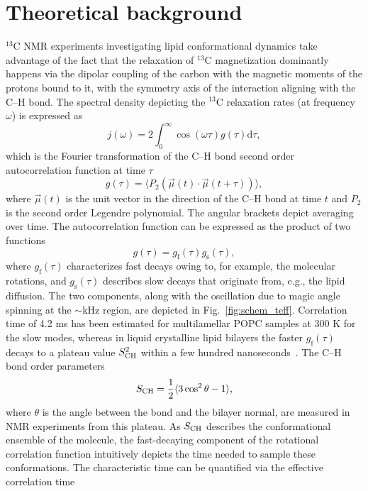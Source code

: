 \documentclass[journal=jpcbfk,manuscript=article,layout=twocolumn]{achemso}
\begin{document}
\section{Theoretical background}\label{sec:theory}
$^{13}$C NMR experiments investigating lipid conformational dynamics take advantage of the fact that the relaxation of $^{13}$C magnetization dominantly happens via the dipolar coupling of the carbon with the magnetic moments of the protons bound to it, with the symmetry axis of the interaction aligning with the C--H bond. The spectral density depicting the $^{13}$C relaxation rates (at frequency $\omega$) is expressed as
\begin{equation}
j{(\omega)}=2\int_{0}^{\infty}\cos(\omega\tau)g(\tau)\mathrm d\tau ,
\end{equation}
which is the Fourier transformation of the C--H bond second order autocorrelation function at time $\tau$
\begin{equation}
\label{eq:BCF}
g(\tau)=\langle P_{2}\left(\vec{\mu}(t)\cdot \vec{\mu}(t+\tau)\right)\rangle ,
\end{equation}
where $\vec{\mu}(t)$ is the unit vector in the direction of the C--H bond at time $t$ and $P_{2}$ is the second order Legendre polynomial. The angular brackets depict averaging over time. The autocorrelation function can be expressed as the product of two functions
\begin{equation}
g(\tau)=g_{\mathrm{f}}(\tau)g_{\mathrm{s}}(\tau) ,
\end{equation} 
where $g_{\mathrm{f}}(\tau)$ characterizes fast decays owing to, for example, the molecular  rotations, and $g_{\mathrm{s}}(\tau)$ describes slow decays that originate from, e.g., the lipid diffusion. The two components, along with the oscillation due to magic angle spinning at the $\sim$kHz region, are depicted in Fig.~\ref{fig:schem_teff}. Correlation time of 4.2 ms has been estimated for multilamellar POPC samples at 300 K for the slow modes, whereas  in liquid crystalline lipid bilayers the faster $g_{\mathrm{f}}(\tau)$ decays to a plateau value $S^{2}_{\rm{CH}}$ within a few hundred nanoseconds~\cite{ferreira15}. The C--H bond order parameters
\begin{equation}
\label{eq:OP}
S_{\rm{CH}}=\frac{1}{2}\langle 3\cos^{2}\theta-1\rangle ,
\end{equation}
where $\theta$ is the angle between the bond and the bilayer normal, are measured in NMR experiments from this plateau. As $S_{\rm{CH}}$ describes the conformational ensemble of the molecule, the fast-decaying component of the rotational correlation function intuitively depicts the time needed to sample these conformations. The characteristic time can be quantified via the effective correlation time
\end{document}
